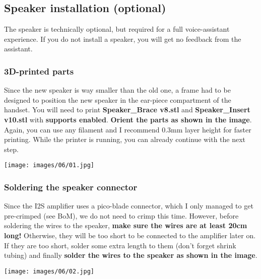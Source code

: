 \documentclass[]{article}
\begin{document}
\subsection{Speaker installation (optional)}
The speaker is technically optional, but required for a full voice-assistant experience. If you do not install a speaker, you will get no feedback from the assistant.

\subsubsection{3D-printed parts}
\begin{minipage}[t]{0.4\linewidth}
	\vspace{0pt}
	Since the new speaker is way smaller than the old one, a frame had to be designed to position the new speaker in the ear-piece compartment of the handset. You will need to print \textbf{Speaker\_Brace v8.stl} and \textbf{Speaker\_Insert v10.stl} with \textbf{supports enabled}. \textbf{Orient the parts as shown in the image}. Again, you can use any filament and I recommend 0.3mm layer height for faster printing. While the printer is running, you can already continue with the next step.
\end{minipage}
\hfill
\begin{minipage}[t]{0.5\linewidth}
	\vspace{0pt}
	\texttt{[image: images/06/01.jpg]}
\end{minipage}

\subsubsection{Soldering the speaker connector}
\begin{minipage}[t]{0.4\linewidth}
	\vspace{0pt}
	Since the I2S amplifier uses a pico-blade connector, which I only managed to get pre-crimped (see BoM), we do not need to crimp this time. However, before soldering the wires to the speaker, \textbf{make sure the wires are at least 20cm long!} Otherwise, they will be too short to be connected to the amplifier later on. If they are too short, solder some extra length to them (don't forget shrink tubing) and finally \textbf{solder the wires to the speaker as shown in the image}.
\end{minipage}
\hfill
\begin{minipage}[t]{0.5\linewidth}
	\vspace{0pt}
	\texttt{[image: images/06/02.jpg]}
\end{minipage}
\end{document}
